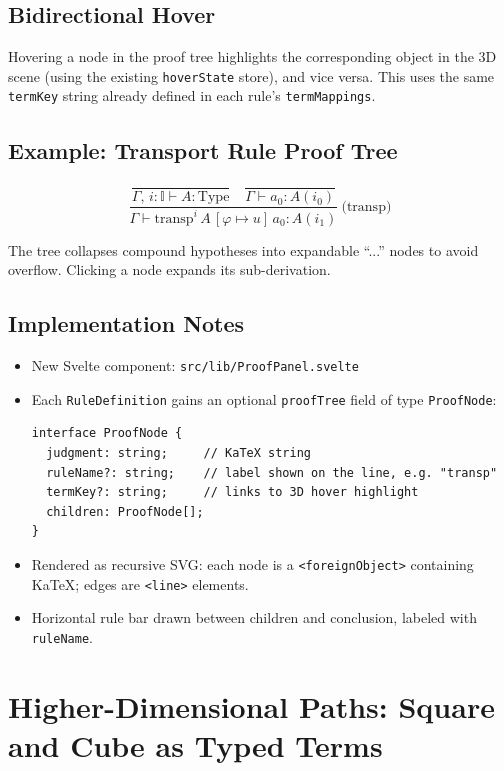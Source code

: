\documentclass[11pt,a4paper]{article}
\begin{document}
\subsection{Bidirectional Hover}

Hovering a node in the proof tree highlights the corresponding object in the
3D scene (using the existing \texttt{hoverState} store), and vice versa.
This uses the same \texttt{termKey} string already defined in each rule's
\texttt{termMappings}.

\subsection{Example: Transport Rule Proof Tree}

\[
\dfrac{
  \dfrac{}{\Gamma,\,i{:}\mathbb{I} \vdash A : \mathrm{Type}}
  \quad
  \dfrac{}{\Gamma \vdash a_0 : A(i_0)}
}{
  \Gamma \vdash \mathrm{transp}^i\,A\,[\varphi \mapsto u]\,a_0 : A(i_1)
}\ \text{(transp)}
\]

The tree collapses compound hypotheses into expandable ``...'' nodes to avoid
overflow. Clicking a node expands its sub-derivation.

\subsection{Implementation Notes}

\begin{itemize}
  \item New Svelte component: \texttt{src/lib/ProofPanel.svelte}
  \item Each \texttt{RuleDefinition} gains an optional \texttt{proofTree} field
    of type \texttt{ProofNode}:
\begin{verbatim}
interface ProofNode {
  judgment: string;     // KaTeX string
  ruleName?: string;    // label shown on the line, e.g. "transp"
  termKey?: string;     // links to 3D hover highlight
  children: ProofNode[];
}
\end{verbatim}
  \item Rendered as recursive SVG: each node is a \texttt{<foreignObject>}
    containing KaTeX; edges are \texttt{<line>} elements.
  \item Horizontal rule bar drawn between children and conclusion, labeled with
    \texttt{ruleName}.
\end{itemize}

\section{Higher-Dimensional Paths: Square and Cube as Typed Terms}
\end{document}
